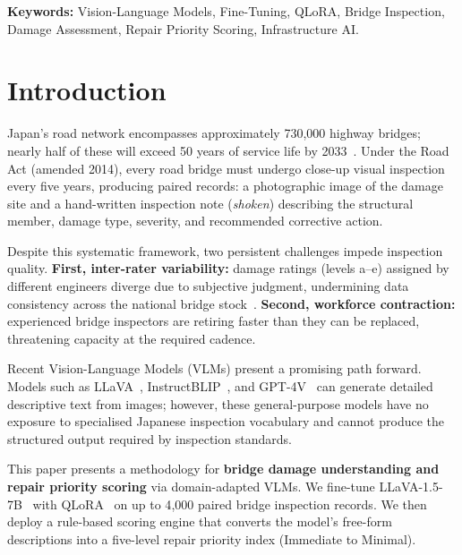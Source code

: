 \documentclass[twocolumn]{article}
\begin{document}
\noindent
\textbf{Keywords:} Vision-Language Models, Fine-Tuning, QLoRA, Bridge Inspection,
Damage Assessment, Repair Priority Scoring, Infrastructure AI.

\section{Introduction}
\label{sec:introduction}

Japan's road network encompasses approximately 730{,}000 highway bridges;
nearly half of these will exceed 50 years of service life by
2033~\cite{mlit2023bridge}.
Under the Road Act (amended 2014), every road bridge must undergo close-up
visual inspection every five years, producing paired records: a photographic
image of the damage site and a hand-written inspection note (\textit{shoken})
describing the structural member, damage type, severity, and recommended
corrective action.

Despite this systematic framework, two persistent challenges impede inspection
quality.
\textbf{First, inter-rater variability:} damage ratings (levels a--e) assigned
by different engineers diverge due to subjective judgment, undermining data
consistency across the national bridge stock~\cite{mlit2023bridge}.
\textbf{Second, workforce contraction:} experienced bridge inspectors are
retiring faster than they can be replaced, threatening capacity at the
required cadence.

Recent Vision-Language Models (VLMs) present a promising path forward.
Models such as LLaVA~\cite{liu2024llava},
InstructBLIP~\cite{dai2023instructblip}, and GPT-4V~\cite{openai2023gpt4}
can generate detailed descriptive text from images; however, these
general-purpose models have no exposure to specialised Japanese inspection
vocabulary and cannot produce the structured output required by inspection
standards.

This paper presents a methodology for \textbf{bridge damage understanding and
repair priority scoring} via domain-adapted VLMs.
We fine-tune LLaVA-1.5-7B~\cite{liu2024llava} with
QLoRA~\cite{dettmers2023qlora} on up to 4{,}000 paired bridge inspection
records.
We then deploy a rule-based scoring engine that converts the model's
free-form descriptions into a five-level repair priority index
(Immediate to Minimal).
\end{document}
